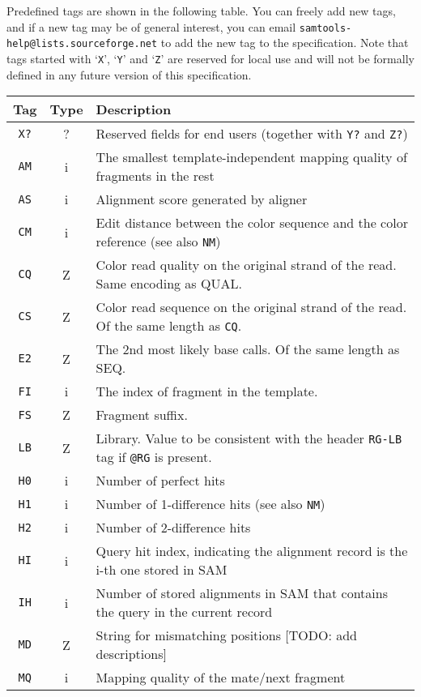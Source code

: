 \documentclass[10pt]{article}
\begin{document}
{\flushleft Predefined tags are shown in the following table. You can
  freely add new tags, and if a new tag may be of general interest, you
  can email {\tt samtools-help@lists.sourceforge.net} to add the new tag
  to the specification. Note that tags started with `{\tt X}', `{\tt Y}'
  and `{\tt Z}' are reserved for local use and will not be formally
  defined in any future version of this specification.}
\begin{center}\small
\begin{tabular}{ccp{12.5cm}}
  \hline
  {\bf Tag} & {\bf Type} & {\bf Description} \\
  \hline
  {\tt X?} & ? & Reserved fields for end users (together with {\tt Y?} and {\tt Z?}) \\
  {\tt AM} & i & The smallest template-independent mapping quality of fragments in the rest \\
  {\tt AS} & i & Alignment score  generated by aligner \\
  {\tt CM} & i & Edit distance between the color sequence and the color reference (see also {\tt NM})\\
  {\tt CQ} & Z & Color read quality on the original strand of the read. Same encoding as {\sf QUAL}.\\
  {\tt CS} & Z & Color read sequence on the original strand of the read. Of the same length as {\tt CQ}. \\
  {\tt E2} & Z & The 2nd most likely base calls. Of the same length as {\sf SEQ}. \\
  {\tt FI} & i & The index of fragment in the template.\\
  {\tt FS} & Z & Fragment suffix.\\
  {\tt LB} & Z & Library. Value to be consistent with the header {\tt RG-LB} tag if {\tt @RG} is present.\\
  {\tt H0} & i & Number of perfect hits\\
  {\tt H1} & i & Number of 1-difference hits (see also {\tt NM})\\
  {\tt H2} & i & Number of 2-difference hits \\
  {\tt HI} & i & Query hit index, indicating the alignment record is the i-th one stored in SAM\\
  {\tt IH} & i & Number of stored alignments in SAM that contains the query in the current record\\
  {\tt MD} & Z & String for mismatching positions [TODO: add descriptions]\\
  {\tt MQ} & i & Mapping quality of the mate/next fragment \\

\end{tabular}
\end{center}
\end{document}
